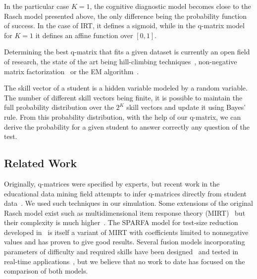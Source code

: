 \documentclass{edm_template}
\begin{document}
In the particular case $K=1$, the cognitive diagnostic model becomes close to the Rasch model presented above, the only difference being the probability function of success. In the case of IRT, it defines a sigmoid, while in the q-matrix model for $K = 1$ it defines an affine function over $[0,1]$.

Determining the best q-matrix that fits a given dataset is currently an open field of research, the state of the art being hill-climbing techniques~\cite{Barnes2005}, non-negative matrix factorization~\cite{Desmarais2011} or the EM algorithm~\cite{Huebner2010}. 

The skill vector of a student is a hidden variable modeled by a random variable. The number of different skill vectors being finite, it is possible to maintain the full probability distribution over the $2^K$ skill vectors and update it using Bayes' rule. From this probability distribution, with the help of our q-matrix, we can derive the probability for a given student to answer correctly any question of the test.



\subsection{Related Work}

Originally, q-matrices were specified by experts, but recent work in the educational data mining field attempts to infer q-matrices directly from student data~\cite{Huebner2010}. We used such techniques in our simulation. Some extensions of the original Rasch model exist such as multidimensional item response theory (MIRT)~\cite{Segall1996} but their complexity is much higher~\cite{Desmarais2012}. The SPARFA model for test-size reduction developed in~\cite{Vats2013} is itself a variant of MIRT with coefficients limited to nonnegative values and has proven to give good results. Several fusion models incorporating parameters of difficulty and required skills have been designed~\cite{McGlohen2008} and tested in real-time applications~\cite{Wang2013}, but we believe that no work to date has focused on the comparison of both models.

\end{document}
